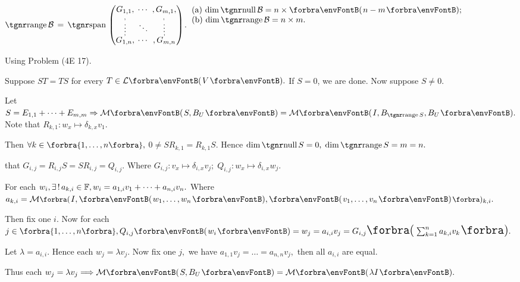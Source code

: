 $\range\mathcal{B}\,=\,\Spn${\normalsize$\begin{pmatrix} \underset{\;,}{G_{1,1}}, &\hspace{-6pt} \cdots &\hspace{-6pt} ,\underset{\!\!,}{G_{m,1}},\\[-2pt] \vdots &\hspace{-6pt} \ddots &\hspace{-6pt} \vdots\\[-2pt] \overset{\;,}{G_{1,n}}, &\hspace{-6pt} \cdots &\hspace{-6pt} ,\overset{\!\!\!,}{G_{m,n}}\end{pmatrix}$}. \;$\hText{$(a) $\dim\null\mathcal{B}=n\times\Par{n-m};\\$(b) $\dim\range\mathcal{B}=n\times m.\\\,\\\,}$\PfEnd\vspace{-8pt}
\SepLine\pagebreak

Using Problem (4E 17). \par\quad
Suppose $ST=TS$ for every $T\in\Lm{V}.$ If $S=0$, we are done. Now suppose $S\neq 0.$\par\quad
{\vspace{2pt}Let {$S=E_{1,1}+\dots+E_{m,m}\Rightarrow \Mt{S,B_U}=\Mt{I,B_{\range S},B_U}.$} Note that $R_{k,1}:w_x\mapsto\delta_{k,x}v_1.$}\par\quad
{\vspace{2pt}Then $\forall k\in\Bra{1,\dots,n},$ {\Large\envFontLarge$0\neq SR_{k,1}=R_{k,1}S.$} Hence $\dim\null S=0,\;\dim\range S=m=n.$}\par\quad
{\vspace{2pt}\NOTICE that {\Large\envFontLarge$G_{i,j}=R_{i,j}S=SR_{i,j}=Q_{i,j}$}. Where $G_{i,j}:v_x\mapsto\delta_{i,x}v_j;\;Q_{i,j}:w_x\mapsto\delta_{i,x}w_j.$}\par\quad
For each $w_i,\exists\,!\,a_{k,i}\in{\mathbb{F}},w_i=a_{1,i}v_1+\dots+a_{n,i}v_n.$ Where $a_{k,i}=\Mt[\BigPar]{I,\Par{w_1,\dots,w_n},\Par{v_1,\dots,v_n}}{_{k,i}}.$\par\quad
Then fix one $i.$ Now for each $j\in\Bra{1,\dots,n},Q_{i,j}\Par{w_i}=w_j=a_{i,i}v_j=G_{i,j}\envFontLarge\BigPar{\sum_{k=1}^na_{k,i} v_k}.$\par\quad
Let $\lambda=a_{i,i}.$ Hence each $w_j=\lambda v_j.$ Now fix one $j,$ we have $a_{1,1}v_j=\dots=a_{n,n}v_j,$ then all $a_{i,i}$ are equal.\par\quad
Thus each $w_j=\lambda v_j\Longrightarrow\Mt{S,B_U}=\Mt{\lambda I}.$\PfEnd
\SepLine

